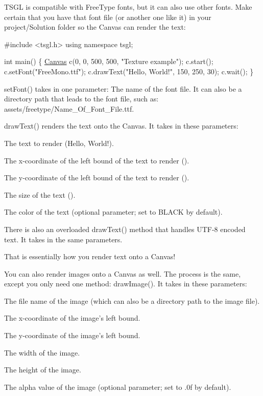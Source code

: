 T\-S\-G\-L is compatible with Free\-Type fonts, but it can also use other fonts. Make certain that you have that font file (or another one like it) in your project/\-Solution folder so the Canvas can render the text\-:


\begin{DoxyCode}
\textcolor{preprocessor}{#include <tsgl.h>}
\textcolor{keyword}{using namespace }tsgl;

\textcolor{keywordtype}{int} main() \{
  \hyperlink{classtsgl_1_1_canvas}{Canvas} c(0, 0, 500, 500, \textcolor{stringliteral}{"Texture example"});
  c.start();
  c.setFont(\textcolor{stringliteral}{"FreeMono.ttf"});
  c.drawText(\textcolor{stringliteral}{"Hello, World!"}, 150, 250, 30);
  c.wait();
\}
\end{DoxyCode}


{\ttfamily set\-Font()} takes in one parameter\-: The name of the font file. It can also be a directory path that leads to the font file, such as\-: {\ttfamily assets/freetype/\-Name\-\_\-\-Of\-\_\-\-Font\-\_\-\-File.\-ttf}.

{\ttfamily draw\-Text()} renders the text onto the Canvas. It takes in these parameters\-:


\begin{DoxyItemize}
\item The text to render ({\ttfamily Hello, World!}).
\item The x-\/coordinate of the left bound of the text to render ({}).
\item The y-\/coordinate of the left bound of the text to render ({}).
\item The size of the text ({}).
\item The color of the text (optional parameter; set to {\ttfamily B\-L\-A\-C\-K} by default).
\end{DoxyItemize}

There is also an overloaded {\ttfamily draw\-Text()} method that handles U\-T\-F-\/8 encoded text. It takes in the same parameters.

That is essentially how you render text onto a Canvas!

You can also render images onto a Canvas as well. The process is the same, except you only need one method\-: {\ttfamily draw\-Image()}. It takes in these parameters\-:


\begin{DoxyItemize}
\item The file name of the image (which can also be a directory path to the image file).
\item The x-\/coordinate of the image's left bound.
\item The y-\/coordinate of the image's left bound.
\item The width of the image.
\item The height of the image.
\item The alpha value of the image (optional parameter; set to {.\-0f} by default).
\end{DoxyItemize}

